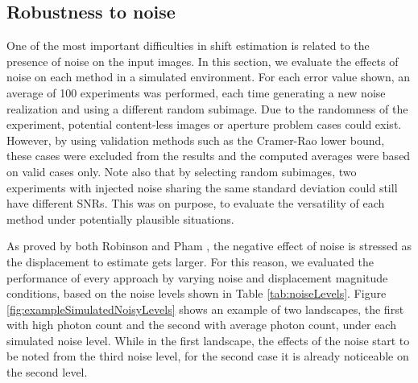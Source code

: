 \subsection{Robustness to noise}
One of the most important difficulties in shift estimation is related to the presence of noise on the input images. In this section, we evaluate the effects of noise on each method in a simulated environment. For each error value shown, an average of 100 experiments was performed, each time generating a new noise realization and using a different random subimage. Due to the randomness of the  experiment, potential content-less images or aperture problem cases could exist. However, by using validation methods such as the Cramer-Rao lower bound, these cases were excluded from the results and the computed averages were based on valid cases only. Note also that by selecting random subimages, two experiments with injected noise sharing the same standard deviation could still have different SNRs. This was on purpose, to evaluate the versatility of each method under potentially plausible situations.

As proved by both Robinson \cite{Robinson2004} and Pham \cite{pham2005performance}, the negative effect of noise is stressed as the displacement to estimate gets larger. For this reason, we evaluated the performance of every approach by varying noise and displacement magnitude conditions, based on the noise levels shown in Table \ref{tab:noiseLevels}. Figure \ref{fig:exampleSimulatedNoisyLevels} shows an example of two landscapes, the first with high photon count and the second with average photon count, under each simulated noise level. While in the first landscape, the effects of the noise start to be noted from the third noise level, for the second case it is already noticeable on the second level.


